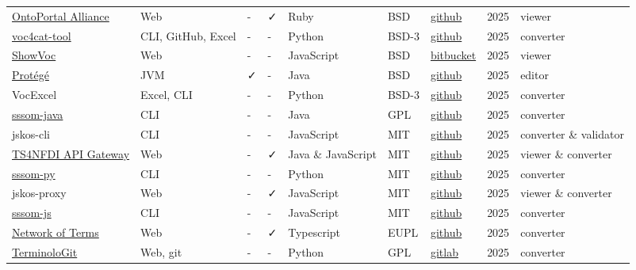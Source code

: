 \documentclass[
  DIV=10]{article}
\begin{document}
\begin{longtable}[]{@{}lllllllll@{}}
\href{https://ontoportal.org/}{OntoPortal Alliance} & Web & - & ✓ & Ruby
& BSD & \href{https://github.com/ontoportal}{github} & 2025 & viewer \\
\href{https://github.com/nfdi4cat/voc4cat-tool/}{voc4cat-tool} & CLI,
GitHub, Excel & - & - & Python & BSD-3 &
\href{https://github.com/nfdi4cat/voc4cat-tool/}{github} & 2025 &
converter \\
\href{https://showvoc.uniroma2.it/}{ShowVoc} & Web & - & - & JavaScript
& BSD &
\href{https://bitbucket.org/art-uniroma2/showvoc/src/master/}{bitbucket}
& 2025 & viewer \\
\href{https://protege.stanford.edu/}{Protégé} & JVM & ✓ & - & Java & BSD
& \href{https://github.com/protegeproject/protege}{github} & 2025 &
editor \\
VocExcel & Excel, CLI & - & - & Python & BSD-3 &
\href{https://github.com/Kurrawong/VocExcel}{github} & 2025 &
converter \\
\href{https://incenp.org/dvlpt/sssom-java/}{sssom-java} & CLI & - & - &
Java & GPL & \href{https://github.com/gouttegd/sssom-java}{github} &
2025 & converter \\
jskos-cli & CLI & - & - & JavaScript & MIT &
\href{https://github.com/gbv/jskos-cli/}{github} & 2025 & converter \&
validator \\
\href{https://ts4nfdi.github.io/api-gateway/}{TS4NFDI API Gateway} & Web
& - & ✓ & Java \& JavaScript & MIT &
\href{https://github.com/ts4nfdi/api-gateway}{github} & 2025 & viewer \&
converter \\
\href{https://mapping-commons.github.io/sssom-py}{sssom-py} & CLI & - &
- & Python & MIT &
\href{https://github.com/mapping-commons/sssom-py}{github} & 2025 &
converter \\
jskos-proxy & Web & - & ✓ & JavaScript & MIT &
\href{https://github.com/gbv/jskos-proxy/}{github} & 2025 & viewer \&
converter \\
\href{https://www.npmjs.org/package/sssom}{sssom-js} & CLI & - & - &
JavaScript & MIT & \href{https://github.com/gbv/sssom-js}{github} & 2025
& converter \\
\href{https://github.com/netwerk-digitaal-erfgoed/network-of-terms}{Network
of Terms} & Web & - & ✓ & Typescript & EUPL &
\href{https://github.com/netwerk-digitaal-erfgoed/network-of-terms}{github}
& 2025 & converter \\
\href{https://termgit.elga.gv.at/}{TerminoloGit} & Web, git & - & - &
Python & GPL & \href{https://gitlab.com/elga-gmbh/termgit}{gitlab} &
2025 & converter \\

\end{longtable}
\end{document}

